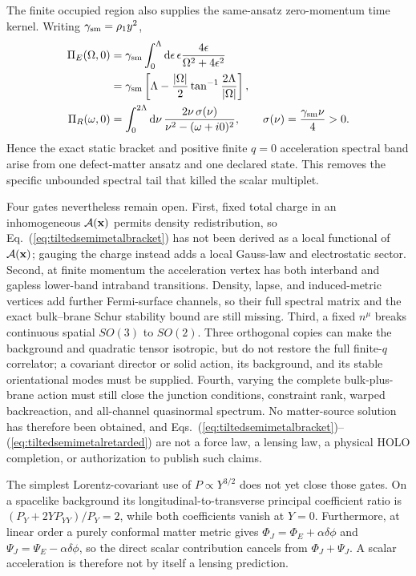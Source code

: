 \documentclass[10pt]{article}
\newcommand{\dd}{\mathrm{d}}
\begin{document}
The finite occupied region also supplies the same-ansatz zero-momentum time
kernel.
Writing $\gamma_{\rm sm}=\rho_1y^2$,
\begin{equation}
 \begin{aligned}
 \Pi_E(\Omega,0)
 &=\gamma_{\rm sm}\int_0^\Lambda\dd\epsilon\,\epsilon
 \frac{4\epsilon}{\Omega^2+4\epsilon^2}\\
 &=\gamma_{\rm sm}\left[\Lambda-\frac{|\Omega|}{2}
 \tan^{-1}\frac{2\Lambda}{|\Omega|}\right],\\
 \Pi_R(\omega,0)&=\int_0^{2\Lambda}\dd\nu\,
 \frac{2\nu\,\sigma(\nu)}{\nu^2-(\omega+i0)^2},
 \qquad \sigma(\nu)=\frac{\gamma_{\rm sm}\nu}{4}>0 .
 \end{aligned}
 \label{eq:tiltedsemimetalretarded}
\end{equation}
Hence the exact static bracket and positive finite $q=0$ acceleration spectral
band arise from one defect-matter ansatz and one declared state.  This removes the
specific unbounded spectral tail that killed the scalar multiplet.

Four gates nevertheless remain open.  First, fixed total charge in an
inhomogeneous ${\cal A}(\mathbf x)$ permits density redistribution, so
Eq.~(\ref{eq:tiltedsemimetalbracket}) has not been derived as a local functional
of ${\cal A}(\mathbf x)$; gauging the charge instead adds a local Gauss-law and
electrostatic sector.  Second, at finite momentum the acceleration vertex has
both interband and gapless lower-band intraband transitions.  Density, lapse,
and induced-metric vertices add further Fermi-surface channels, so their full
spectral matrix and the exact bulk--brane Schur stability bound are still
missing.  Third, a fixed $n^\mu$ breaks continuous spatial $SO(3)$ to $SO(2)$.
Three orthogonal copies can make the background and quadratic tensor
isotropic, but do not restore the full finite-$q$ correlator; a covariant
director or solid action, its background, and its stable orientational modes
must be supplied.  Fourth, varying the complete bulk-plus-brane action must
still close the junction conditions, constraint rank, warped backreaction, and
all-channel quasinormal spectrum.  No matter-source solution has therefore been obtained,
and Eqs.~(\ref{eq:tiltedsemimetalbracket})--
(\ref{eq:tiltedsemimetalretarded}) are not a force law, a lensing law, a
physical HOLO completion, or authorization to publish such claims.

The simplest Lorentz-covariant use of $P\propto Y^{3/2}$ does not yet close
those gates.  On a spacelike background its longitudinal-to-transverse
principal coefficient ratio is
$(P_Y+2YP_{YY})/P_Y=2$, while both coefficients vanish at $Y=0$.
Furthermore, at linear order a purely conformal matter metric gives
$\Phi_J=\Phi_E+\alpha\delta\phi$ and
$\Psi_J=\Psi_E-\alpha\delta\phi$, so the direct scalar contribution cancels
from $\Phi_J+\Psi_J$.  A scalar acceleration is therefore not by itself a
lensing prediction.
\end{document}
